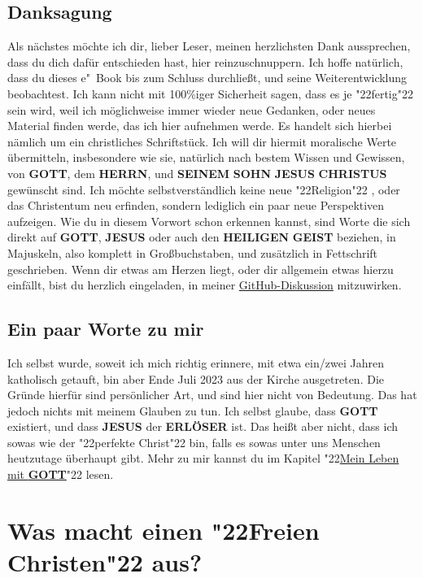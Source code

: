 \documentclass[10pt,a5paper]{article}
\newcommand{\Christus}[0]{\textbf{CHRISTUS}}
\newcommand{\Erloeser}[0]{\textbf{ERL\"OSER}}
\newcommand{\Geist}[0]{\textbf{GEIST}}
\newcommand{\Gott}[0]{\textbf{GOTT}}
\newcommand{\Heiligen}[0]{\textbf{HEILIGEN}}
\newcommand{\Herrn}[0]{\textbf{HERRN}}
\newcommand{\Jesus}[0]{\textbf{JESUS}}
\newcommand{\Seinem}[0]{\textbf{SEINEM}}
\newcommand{\Sohn}[0]{\textbf{SOHN}}
\newcommand{\q}[1]{\char"22{#1}\char"22 }
\begin{document}
	\subsection{Danksagung}
		Als n\"achstes m\"ochte ich dir,
		lieber Leser,
		meinen herzlichsten Dank aussprechen,
		dass du dich daf\"ur entschieden hast,
		hier reinzuschnuppern.
		Ich hoffe nat\"urlich,
		dass du dieses e"~Book bis zum Schluss durchlie{\ss}t,
		und seine Weiterentwicklung beobachtest.
		Ich kann nicht mit 100\%iger Sicherheit sagen,
		dass es je \q{fertig} sein wird,
		weil ich m\"oglichweise immer wieder neue Gedanken,
		oder neues Material finden werde,
		das ich hier aufnehmen werde.
		Es handelt sich hierbei n\"amlich um ein christliches Schriftst\"uck.
		Ich will dir hiermit moralische Werte \"ubermitteln,
		insbesondere wie sie,
		nat\"urlich nach bestem Wissen und Gewissen,
		von {\Gott},
		dem {\Herrn},
		und {\Seinem} {\Sohn} {\Jesus} {\Christus} gew\"unscht sind.
		Ich m\"ochte selbstverst\"andlich keine neue \q{Religion},
		oder das Christentum neu erfinden,
		sondern lediglich ein paar neue Perspektiven aufzeigen.
		Wie du in diesem Vorwort schon erkennen kannst,
		sind Worte die sich direkt auf {\Gott},
		{\Jesus} oder auch den {\Heiligen} {\Geist} beziehen,
		in Majuskeln,
		also komplett in Gro{\ss}buchstaben,
		und zus\"atzlich in Fettschrift geschrieben.
		Wenn dir etwas am Herzen liegt,
		oder dir allgemein etwas hierzu einf\"allt,
		bist du herzlich eingeladen,
		in meiner \href{https://github.com/DerRobert-28/Der-Freie-Christ/discussions}{GitHub-Diskussion} mitzuwirken.
	
	\subsection{Ein paar Worte zu mir}
		Ich selbst wurde,
		soweit ich mich richtig erinnere,
		mit etwa ein/zwei Jahren katholisch getauft,
		bin aber Ende Juli 2023 aus der Kirche ausgetreten.
		Die Gr\"unde hierf\"ur sind pers\"onlicher Art,
		und sind hier nicht von Bedeutung.
		Das hat jedoch nichts mit meinem Glauben zu tun.
		Ich selbst glaube,
		dass {\Gott} existiert,
		und dass {\Jesus} der {\Erloeser} ist.
		Das hei{\ss}t aber nicht,
		dass ich sowas wie der \q{perfekte Christ} bin,
		falls es sowas unter uns Menschen heutzutage \"uberhaupt gibt.
		Mehr zu mir kannst du im Kapitel \q{\hyperref[MeinLebenMitGott]{Mein Leben mit {\Gott}}} lesen.
	
	\newpage
	\section{Was macht einen \q{Freien Christen} aus?}
	
\end{document}

